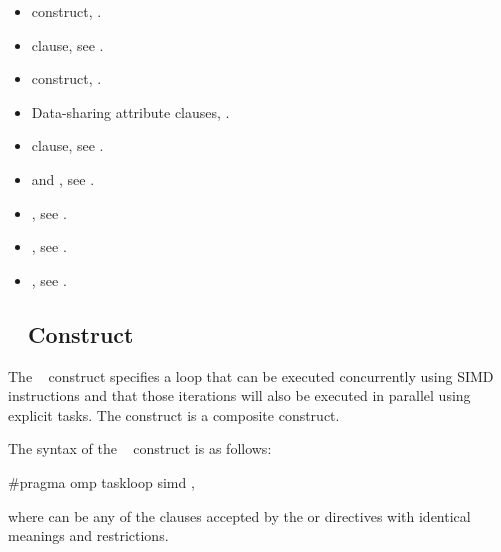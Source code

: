 \crossreferences
\begin{itemize}
\item {} construct, .

\item {} clause, see .

\item {} construct, .

\item Data-sharing attribute clauses, .

\item {} clause, see .

\item {} and , see
 .

\item {}, see .

\item {}, see
.

\item {}, see 
.

\end{itemize}



\subsection{~ Construct}
\label{subsec:taskloop simd Construct}
\summary
The ~ construct specifies a loop that can be
executed concurrently using SIMD instructions and that those iterations
will also be executed in parallel using explicit tasks. The 
 construct is a composite construct.

\syntax
\begin{ccppspecific}
The syntax of the ~ construct is as follows:
\begin{ompcPragma}
#pragma omp taskloop simd \plc{[clause[[},\plc{] clause] ...] new-line}
\end{ompcPragma}
where  can be any of the clauses accepted by the  
or  directives with identical meanings and restrictions.
\end{ccppspecific}

